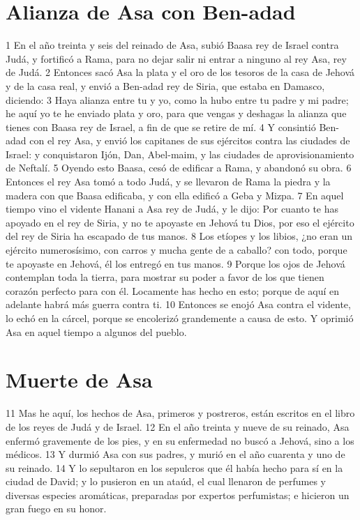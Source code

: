 \section*{Alianza de Asa con Ben-adad}

1 En el año treinta y seis del reinado de Asa, subió Baasa rey de Israel contra Judá, y fortificó a Rama, para no dejar salir ni entrar a ninguno al rey Asa, rey de Judá.
2 Entonces sacó Asa la plata y el oro de los tesoros de la casa de Jehová y de la casa real, y envió a Ben-adad rey de Siria, que estaba en Damasco, diciendo:
3 Haya alianza entre tu y yo, como la hubo entre tu padre y mi padre; he aquí yo te he enviado plata y oro, para que vengas y deshagas la alianza que tienes con Baasa rey de Israel, a fin de que se retire de mí.
4 Y consintió Ben-adad con el rey Asa, y envió los capitanes de sus ejércitos contra las ciudades de Israel: y conquistaron Ijón, Dan, Abel-maim, y las ciudades de aprovisionamiento de Neftalí.
5 Oyendo esto Baasa, cesó de edificar a Rama, y abandonó su obra.
6 Entonces el rey Asa tomó a todo Judá, y se llevaron de Rama la piedra y la madera con que Baasa edificaba, y con ella edificó a Geba y Mizpa.
7 En aquel tiempo vino el vidente Hanani a Asa rey de Judá, y le dijo: Por cuanto te has apoyado en el rey de Siria, y no te apoyaste en Jehová tu Dios, por eso el ejército del rey de Siria ha escapado de tus manos.
8 Los etíopes y los libios, ¿no eran un ejército numerosísimo, con carros y mucha gente de a caballo? con todo, porque te apoyaste en Jehová, él los entregó en tus manos.
9 Porque los ojos de Jehová contemplan toda la tierra, para mostrar su poder a favor de los que tienen corazón perfecto para con él. Locamente has hecho en esto; porque de aquí en adelante habrá más guerra contra ti.
10 Entonces se enojó Asa contra el vidente, lo echó en la cárcel, porque se encolerizó grandemente a causa de esto. Y oprimió Asa en aquel tiempo a algunos del pueblo.

\section*{Muerte de Asa}

11 Mas he aquí, los hechos de Asa, primeros y postreros, están escritos en el libro de los reyes de Judá y de Israel.
12 En el año treinta y nueve de su reinado, Asa enfermó gravemente de los pies, y en su enfermedad no buscó a Jehová, sino a los médicos.
13 Y durmió Asa con sus padres, y murió en el año cuarenta y uno de su reinado.
14 Y lo sepultaron en los sepulcros que él había hecho para sí en la ciudad de David;
y lo pusieron en un ataúd, el cual llenaron de perfumes y diversas especies aromáticas, preparadas por expertos perfumistas; e hicieron un gran fuego en su honor.


